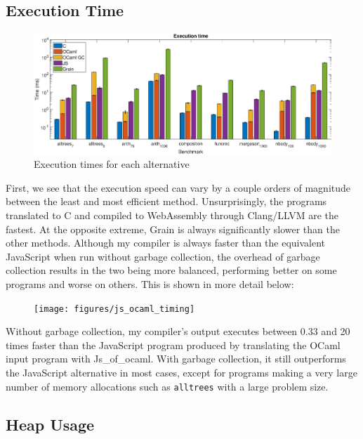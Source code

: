 \subsection{Execution Time}

\begin{figure}[H]
\includegraphics[scale=0.42]{figures/alternatives_timing}
\caption{Execution times for each alternative}
 \label{fig:alt_timing} 
\end{figure}

First, we see that the execution speed can vary by a couple orders of magnitude between the least and most efficient method. Unsurprisingly, the programs translated to C and compiled to WebAssembly through Clang/LLVM are the fastest. At the opposite extreme, Grain is always significantly slower than the other methods. Although my compiler is always faster than the equivalent JavaScript when run without garbage collection, the overhead of garbage collection results in the two being more balanced, performing better on some programs and worse on others. This is shown in more detail below:


\begin{figure}[H]
\hspace{-1.8cm}
\texttt{[image: figures/js\_ocaml\_timing]}
 \label{fig:js_oc_timing} 
\end{figure}

Without garbage collection, my compiler's output	executes between 0.33 and 20 times faster than the JavaScript program produced by translating the OCaml input program with Js\_of\_ocaml. With garbage collection, it still outperforms the JavaScript alternative in most cases, except for programs making a very large number of memory allocations such as \verb|alltrees| with a large problem size.


\subsection{Heap Usage}


